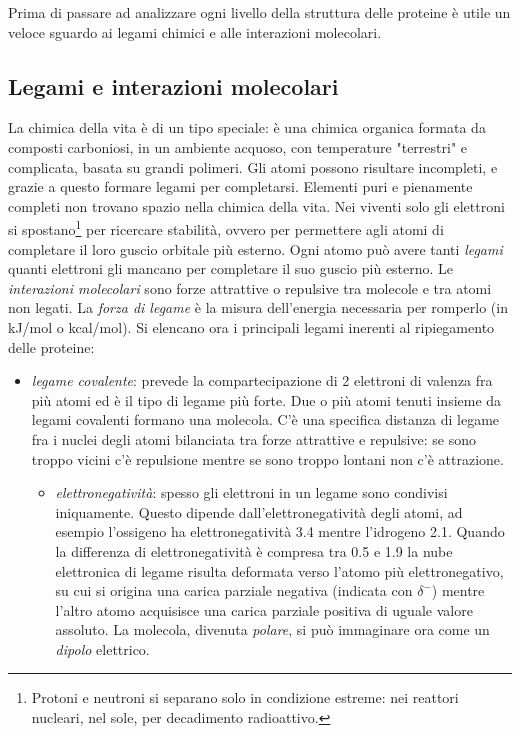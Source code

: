 {Prima di passare ad analizzare ogni livello della struttura delle proteine è utile un veloce sguardo ai legami chimici e  alle interazioni molecolari.

\subsection{Legami e interazioni molecolari} \label{sec:legami-chimici}
{
	La chimica della vita è di un tipo speciale: è una chimica organica formata da composti carboniosi, in un ambiente acquoso, con temperature "terrestri" e complicata, basata su grandi polimeri. Gli atomi possono risultare incompleti, e grazie a questo formare legami per completarsi. Elementi puri e pienamente completi non trovano spazio nella chimica della vita. Nei viventi solo gli elettroni si spostano\footnote{Protoni e neutroni si separano solo in condizione estreme: nei reattori nucleari, nel sole, per decadimento radioattivo.} per ricercare stabilità, ovvero per permettere agli atomi di completare il loro guscio orbitale più esterno. Ogni atomo può avere tanti \textit{legami} quanti elettroni gli mancano per completare il suo guscio più esterno.	Le \textit{interazioni molecolari }sono forze attrattive o repulsive tra molecole e tra atomi
	non legati. La \textit{forza di legame} è la misura dell'energia necessaria per romperlo (in kJ/mol o kcal/mol). Si elencano ora i principali legami inerenti al ripiegamento delle proteine:
		
\begin{itemize}
	\item \textit{legame covalente}: prevede la compartecipazione di 2 elettroni di valenza fra più atomi ed è il tipo di legame più forte. Due o più atomi tenuti insieme da legami covalenti formano una molecola. C'è una specifica distanza di legame fra i nuclei degli atomi bilanciata tra forze attrattive e repulsive: se sono troppo vicini c'è repulsione mentre se sono troppo lontani non c'è attrazione.
		\begin{itemize}
			\item \textit{elettronegatività}: spesso gli elettroni in un legame sono condivisi iniquamente. Questo dipende dall'elettronegatività degli atomi, ad esempio l'ossigeno ha elettronegatività 3.4 mentre l'idrogeno 2.1. Quando la differenza di elettronegatività è compresa tra 0.5 e 1.9 la nube elettronica di legame risulta deformata verso l'atomo più elettronegativo, su cui si origina una carica parziale negativa (indicata con $\delta^{-}$) mentre l'altro atomo acquisisce una carica parziale positiva di uguale valore assoluto. La molecola, divenuta \textit{polare}, si può immaginare ora come un \textit{dipolo }elettrico.


\end{itemize}
\end{itemize}}}
